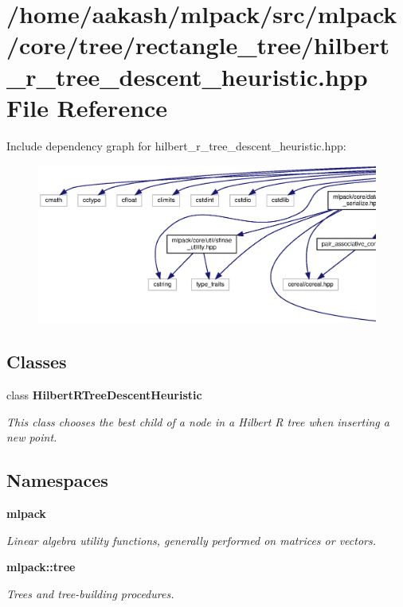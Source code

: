 \section{/home/aakash/mlpack/src/mlpack/core/tree/rectangle\+\_\+tree/hilbert\+\_\+r\+\_\+tree\+\_\+descent\+\_\+heuristic.hpp File Reference}
\label{hilbert__r__tree__descent__heuristic_8hpp}
Include dependency graph for hilbert\+\_\+r\+\_\+tree\+\_\+descent\+\_\+heuristic.\+hpp\+:
\nopagebreak
\begin{figure}[H]
\begin{center}
\leavevmode
\includegraphics[width=350pt]{hilbert__r__tree__descent__heuristic_8hpp__incl}
\end{center}
\end{figure}
\subsection*{Classes}
\begin{DoxyCompactItemize}
\item 
class \textbf{ Hilbert\+R\+Tree\+Descent\+Heuristic}
\begin{DoxyCompactList}\small\item\em This class chooses the best child of a node in a Hilbert R tree when inserting a new point. \end{DoxyCompactList}\end{DoxyCompactItemize}
\subsection*{Namespaces}
\begin{DoxyCompactItemize}
\item 
 \textbf{ mlpack}
\begin{DoxyCompactList}\small\item\em Linear algebra utility functions, generally performed on matrices or vectors. \end{DoxyCompactList}\item 
 \textbf{ mlpack\+::tree}
\begin{DoxyCompactList}\small\item\em Trees and tree-\/building procedures. \end{DoxyCompactList}\end{DoxyCompactItemize}


